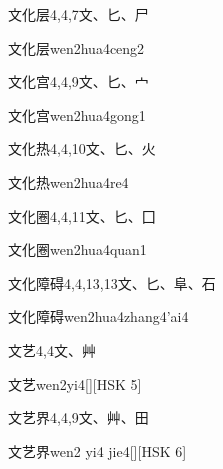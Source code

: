 \begin{entry}{文化层}{4,4,7}{⽂、⼔、⼫}
  \begin{phonetics}{文化层}{wen2hua4ceng2}
  \end{phonetics}
\end{entry}

\begin{entry}{文化宫}{4,4,9}{⽂、⼔、⼧}
  \begin{phonetics}{文化宫}{wen2hua4gong1}
  \end{phonetics}
\end{entry}

\begin{entry}{文化热}{4,4,10}{⽂、⼔、⽕}
  \begin{phonetics}{文化热}{wen2hua4re4}
  \end{phonetics}
\end{entry}

\begin{entry}{文化圈}{4,4,11}{⽂、⼔、⼞}
  \begin{phonetics}{文化圈}{wen2hua4quan1}
  \end{phonetics}
\end{entry}

\begin{entry}{文化障碍}{4,4,13,13}{⽂、⼔、⾩、⽯}
  \begin{phonetics}{文化障碍}{wen2hua4zhang4'ai4}
  \end{phonetics}
\end{entry}

\begin{entry}{文艺}{4,4}{⽂、⾋}
  \begin{phonetics}{文艺}{wen2yi4}[][HSK 5]
  \end{phonetics}
\end{entry}

\begin{entry}{文艺界}{4,4,9}{⽂、⾋、⽥}
  \begin{phonetics}{文艺界}{wen2 yi4 jie4}[][HSK 6]
  \end{phonetics}
\end{entry}

